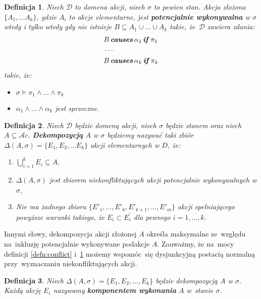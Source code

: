 \documentclass[11pt,a4paper]{article}
\newtheorem{defn}{Definicja}
\DeclareMathOperator{\Causes}{\textbf{\textit{causes}}}
\DeclareMathOperator{\If}{\textbf{\textit{if}}}
\begin{document}
\begin{defn}
    \label{defn:potentially-executable}
    Niech $\mathcal{D}$ to domena akcji, niech $\sigma$ to pewien stan. Akcja złożona $\{ A_1, \dots A_k \}$, gdzie $A_i$ to akcje elementarne, jest \textbf{potencjalnie wykonywalna} w $\sigma$ wtedy i tylko wtedy gdy nie istnieje $B \subseteq A_1 \cup \dots \cup A_k$ takie, że~$\mathcal{D}$ zawiera zdania:
    \begin{align*}
        & B \Causes \alpha_1 \If \pi_1 \\
        & \cdots \\
        & B \Causes \alpha_k \If \pi_k
    \end{align*}
    takie, że:
    \begin{itemize}
        \item $\sigma \models \pi_1 \land \dots \land \pi_k$
        \item $\alpha_1 \land \dots \land \alpha_k$ jest sprzeczne.
    \end{itemize}
\end{defn}

\begin{defn}
    Niech $\mathcal{D}$ będzie domeną akcji, niech $\sigma$ będzie stanem oraz niech $A \subseteq \mathcal{A}c$.
    \textbf{Dekompozycją} $A$ w $\sigma$ będziemy nazywać taki zbiór $\Delta(A, \sigma) = \{ E_1, E_2, \dots E_k \}$ akcji elementarnych w $D$, że:
    \begin{enumerate}
        \item $\bigcup_{i = 1}^{k} E_i \subseteq A$,
        \item $\Delta(A, \sigma)$ jest zbiorem niekonfliktujących akcji potencjalnie wykonywalnych w  $\sigma$,
        \item Nie ma żadnego zbioru $\{ E'_1, \dots, E'_k, E'_{k+1}, \dots, E'_m \}$ akcji spełniającego powyższe warunki takiego, że $E_i \subset E_i^\prime$ dla pewnego $i = 1, \dots, k$.
    \end{enumerate}
\end{defn}

Innymi słowy, dekompozycja akcji złożonej $A$ określa maksymalne ze~względu na~inkluzję potencjalnie wykonywane podakcje $A$.
Zauważmy, że na~mocy definicji \ref{defn:conflict} i~\ref{defn:potentially-executable} możemy wspomóc~się dysjunkcyjną postacią normalną przy~wyznaczaniu niekonfliktujących akcji.
    
\begin{defn}
    Niech $\Delta(A, \sigma) = \{ E_1, E_2, \dots, E_k \}$ będzie dekompozycją $A$ w $\sigma$. Każdą akcję $E_i$ nazywamy \textbf{komponentem wykonania} $A$ w~stanie $\sigma$.
\end{defn}
    
\end{document}
